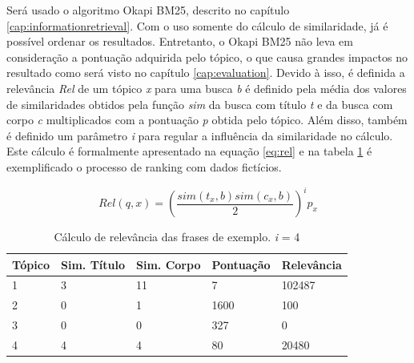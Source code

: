 Será usado o algoritmo Okapi BM25, descrito no capítulo \ref{cap:informationretrieval}. Com o uso somente do cálculo de similaridade, já é possível ordenar os resultados. Entretanto, o Okapi BM25 não leva em consideração a pontuação adquirida pelo tópico, o que causa grandes impactos no resultado como será visto no capítulo \ref{cap:evaluation}. Devido à isso, é definida a relevância \textit{Rel} de um tópico \textit{x} para uma busca \textit{b} é definido pela média dos valores de similaridades obtidos pela função \textit{sim} da busca com título \textit{t} e da busca com corpo \textit{c} multiplicados com a pontuação \textit{p} obtida pelo tópico. Além disso, também é definido um parâmetro \textit{i} para regular a influência da similaridade no cálculo. Este cálculo é formalmente apresentado na equação \ref{eq:rel} e na tabela \ref{tab:relevance} é exemplificado o processo de ranking com dados fictícios.

\begin{equation}
    Rel(q, x) = \left(\frac{sim(t_{x}, b)  sim(c_{x}, b)}{2}\right)^{i}  p_{x} 
    \label{eq:rel}
\end{equation}

\begin{table}[htb]
	\centering
    \def\arraystretch{1.2} %
    \begin{tabular}{|l|l|l|l|l|}
        \hline
        Tópico & Sim. Título & Sim. Corpo & Pontuação & \textbf{Relevância} \\ \hline
        1 & 3 & 11 & 7 & 102487 \\ \hline
        2 & 0 & 1 & 1600 & 100 \\ \hline
        3 & 0 & 0 & 327 & 0 \\ \hline
        4 & 4 & 4 & 80 & 20480 \\ \hline
    \end{tabular}
	\caption{Cálculo de relevância das frases de exemplo. \textit{i} = 4}
    \label{tab:relevance}
\end{table}


